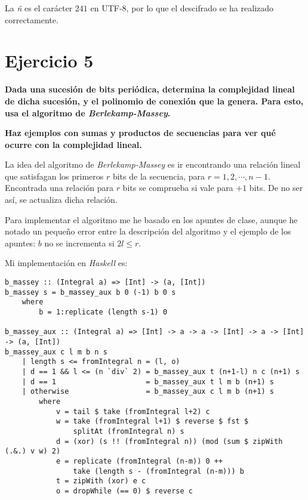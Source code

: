 \documentclass[10pt,spanish]{article}
\begin{document}
La \textit{ñ} es el carácter $241$ en UTF-8, por lo que el descifrado se ha realizado correctamente.

\section{\textcolor{azul}Ejercicio 5}
\textbf{Dada una sucesión de bits periódica, determina la complejidad lineal de dicha sucesión, y el polinomio de conexión que la genera. Para esto, usa el algoritmo de \textit{\textcolor{azul}{Berlekamp-Massey}}.}

\textbf{Haz ejemplos con sumas y productos de secuencias para ver qué ocurre con la complejidad lineal.}

La idea del algoritmo de \textit{\textcolor{azul}{Berlekamp-Massey}} es ir encontrando una relación lineal que satisfagan los primeros $r$ bits de la secuencia, para $r = 1,2,\cdots,n-1$. Encontrada una relación para $r$ bits se comprueba si vale para $+1$ bits. De no ser así, se actualiza dicha relación.

Para implementar el algoritmo me he basado en los apuntes de clase, aunque he notado un pequeño error entre la descripción del algoritmo y el ejemplo de los apuntes: $b$ no se incrementa si $2l \leq r$. 

Mi implementación en \textit{\textcolor{azul}{Haskell}} es:

\begin{verbatim}
b_massey :: (Integral a) => [Int] -> (a, [Int])
b_massey s = b_massey_aux b 0 (-1) b 0 s
    where
        b = 1:replicate (length s-1) 0

b_massey_aux :: (Integral a) => [Int] -> a -> a -> [Int] -> a -> [Int] -> (a, [Int])
b_massey_aux c l m b n s
    | length s <= fromIntegral n = (l, o)
    | d == 1 && l <= (n `div` 2) = b_massey_aux t (n+1-l) n c (n+1) s
    | d == 1                     = b_massey_aux t l m b (n+1) s
    | otherwise                  = b_massey_aux c l m b (n+1) s
        where
            v = tail $ take (fromIntegral l+2) c 
            w = take (fromIntegral l+1) $ reverse $ fst $ 
                splitAt (fromIntegral n) s
            d = (xor) (s !! (fromIntegral n)) (mod (sum $ zipWith (.&.) v w) 2)
            e = replicate (fromIntegral (n-m)) 0 ++ 
                take (length s - (fromIntegral (n-m))) b
            t = zipWith (xor) e c
            o = dropWhile (== 0) $ reverse c

\end{verbatim}
\end{document}

